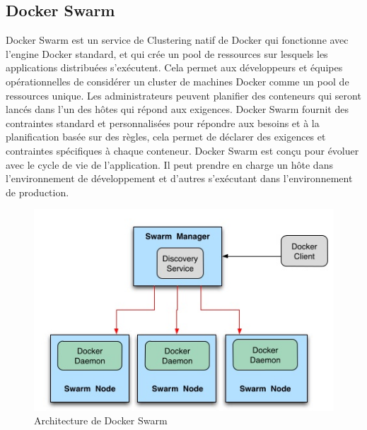\begin{onehalfspace}
\subsection*{Docker Swarm}
 Docker Swarm est un service de Clustering natif de Docker qui fonctionne avec l'engine Docker standard, et qui crée un pool de ressources sur lesquels les applications distribuées s'exécutent. Cela permet aux développeurs et équipes opérationnelles de considérer un cluster de machines Docker comme un pool de ressources unique. Les administrateurs peuvent planifier des conteneurs qui seront lancés dans l'un des hôtes qui répond aux exigences. Docker Swarm fournit des contraintes standard et personnalisées pour répondre aux besoins et à la planification basée sur des règles, cela permet de déclarer des exigences et contraintes spécifiques à chaque conteneur. Docker Swarm est conçu pour évoluer avec le cycle de vie de l'application. Il peut prendre en charge un hôte dans l'environnement de développement et d'autres s'exécutant dans l'environnement de production.
\begin{figure}[H]
\centering
\includegraphics [scale=0.6]{chapitre3/assets/dockerswarm.png}
\caption{Architecture de Docker Swarm}
\end{figure}

\end{onehalfspace}
